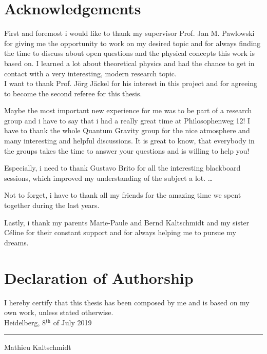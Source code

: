 \thispagestyle{plain}
\section*{Acknowledgements}
First and foremost i would like to thank my supervisor Prof. Jan M. Pawlowski for giving me the opportunity to work on my desired topic and for always finding the time to discuss about open questions and the physical concepts this work is based on. I learned a lot about theoretical physics and had the chance to get in contact with a very interesting, modern research topic. \\

I want to thank Prof. J\"org J\"ackel for his interest in this project and for agreeing to become the second referee for this thesis.


Maybe the most important new experience for me was to be part of a research group and i have to say that i had a really great time at Philosophenweg 12! I have to thank the whole Quantum Gravity group for the nice atmosphere and many interesting and helpful discussions. It is great to know, that everybody in the groups takes the time to answer your questions and is willing to help you!

  Especially, i need  to thank Gustavo Brito for all the interesting blackboard sessions, which improved  my understanding of the subject a lot. \dots 


Not to forget, i have to thank all my friends for the amazing time we spent together during the last years.

Lastly, i thank my parents Marie-Paule and Bernd Kaltschmidt and my sister C\'{e}line for their constant support and for always helping me to pursue my dreams.  
 

\section*{Declaration of Authorship}
I hereby certify that this thesis has been composed by me and is based on my own work, unless stated otherwise.\\

Heidelberg, 8$^{\mathrm{th}}$ of July 2019 \hfill \rule{60mm}{.15mm} \par \vspace{-0.4cm}
\hfill Mathieu Kaltschmidt

